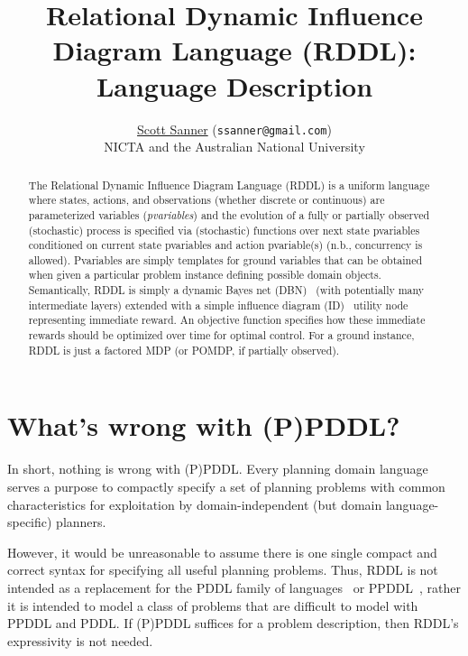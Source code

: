 \documentclass[11pt,a4paper]{article}
\begin{document}
\title{\bf Relational Dynamic Influence Diagram Language (RDDL):
Language Description}
\author{
 \href{http://users.cecs.anu.edu.au/~ssanner/}{Scott Sanner} (\texttt{ssanner@gmail.com}) \\
NICTA and the Australian National University
}
\date{}

\maketitle

\vspace{-5mm}

\begin{abstract}
The Relational Dynamic Influence Diagram Language (RDDL) is a uniform
language where states, actions, and observations (whether discrete or
continuous) are parameterized variables (\emph{pvariables}) and the
evolution of a fully or partially observed (stochastic) process is
specified via (stochastic) functions over next state pvariables
conditioned on current state pvariables and action pvariable(s) (n.b.,
concurrency is allowed).  Pvariables are simply templates
for ground variables that can be obtained when given a particular
problem instance defining possible domain objects.  Semantically, RDDL
is simply a dynamic Bayes net (DBN)~\cite{dbn} (with potentially many
intermediate layers) extended with a simple influence diagram
(ID)~\cite{influence_diagrams} utility node representing immediate
reward.  An objective function specifies how these immediate rewards
should be optimized over time for optimal control.  For a ground
instance, RDDL is just a factored MDP (or POMDP, if partially
observed).
\end{abstract}

\vspace{-3mm}

\setcounter{tocdepth}{2}
\tableofcontents

\newpage

\section{What's wrong with (P)PDDL?}

In short, nothing is wrong with (P)PDDL.  Every planning domain
language serves a purpose to compactly specify a set of
planning problems with common characteristics for exploitation
by domain-independent (but domain language-specific) planners.

However, it would be unreasonable to assume there is one single
compact and correct syntax for specifying all useful planning
problems.  Thus, RDDL is not intended as a replacement for the PDDL family
of languages~\cite{pddl_family} or PPDDL~\cite{ppddl}, rather it is intended
to model a class of problems that are difficult to model with PPDDL
and PDDL.  If (P)PDDL suffices for a problem description, then
RDDL's expressivity is not needed.
\end{document}
